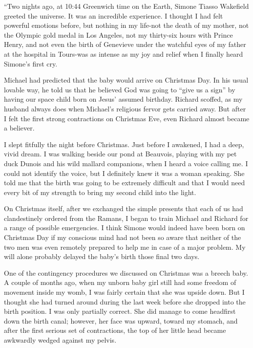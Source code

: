 \documentclass[]{article}
\begin{document}
“Two nights ago, at 10:44 Greenwich time on the Earth, Simone Tiasso Wakefield greeted the universe.  It was an incredible experience.  I thought I had felt powerful emotions before, but nothing in my life-not the death of my mother, not the Olympic gold medal in Los Angeles, not my thirty-six hours with Prince Henry, and not even the birth of Genevieve under the watchful eyes of my father at the hospital in Tours-was as intense as my joy and relief when I finally heard Simone’s first cry.

Michael had predicted that the baby would arrive on Christmas Day.  In his usual lovable way, he told us that he believed God was going to “give us a sign” by having our space child born on Jesus’ assumed birthday.  Richard scoffed, as my husband always does when Michael’s religious fervor gets carried away.  But after I felt the first strong contractions on Christmas Eve, even Richard almost became a believer.

I slept fitfully the night before Christmas.  Just before I awakened, I had a deep, vivid dream.  I was walking beside our pond at Beauvois, playing with my pet duck Dunois and his wild mallard companions, when I heard a voice calling me.  I could not identify the voice, but I definitely knew it was a woman speaking.  She told me that the birth was going to be extremely difficult and that I would need every bit of my strength to bring my second child into the light.

On Christmas itself, after we exchanged the simple presents that each of us had clandestinely ordered from the Ramans, I began to train Michael and Richard for a range of possible emergencies.  I think Simone would indeed have been born on Christmas Day if my conscious mind had not been so aware that neither of the two men was even remotely prepared to help me in case of a major problem.  My will alone probably delayed the baby’s birth those final two days.

One of the contingency procedures we discussed on Christmas was a breech baby.  A couple of months ago, when my unborn baby girl still had some freedom of movement inside my womb, I was fairly certain that she was upside down.  But I thought she had turned around during the last week before she dropped into the birth position.  I was only partially correct.  She did manage to come headfirst down the birth canal; however, her face was upward, toward my stomach, and after the first serious set of contractions, the top of her little head became awkwardly wedged against my pelvis.
\end{document}
